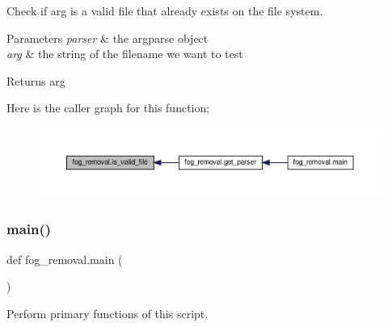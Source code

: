 Check if arg is a valid file that already exists on the file system. 


\begin{DoxyParams}{Parameters}
{\em parser} & the argparse object \\
\hline
{\em arg} & the string of the filename we want to test\\
\hline
\end{DoxyParams}
\begin{DoxyReturn}{Returns}
arg 
\end{DoxyReturn}
Here is the caller graph for this function\+:\nopagebreak
\begin{figure}[H]
\begin{center}
\leavevmode
\includegraphics[width=350pt]{namespacefog__removal_a7b07384f6a6ff8498e14f3aa5f8e2252_icgraph}
\end{center}
\end{figure}
\mbox{\label{namespacefog__removal_a427a577da8405e5624962d7ef722aadf}} 
\subsubsection{\texorpdfstring{main()}{main()}}
{\footnotesize\ttfamily def fog\+\_\+removal.\+main (\begin{DoxyParamCaption}{ }\end{DoxyParamCaption})}



Perform primary functions of this script. 

